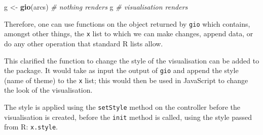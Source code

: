 \documentclass[10pt,]{krantz}
\makeatletter
\newenvironment{Shaded}{\begin{snugshade}}{\end{snugshade}}
\newcommand{\CommentTok}[1]{\textcolor[rgb]{0.37,0.37,0.37}{\textit{#1}}}
\newcommand{\ControlFlowTok}[1]{\textcolor[rgb]{0.27,0.27,0.27}{\textbf{#1}}}
\newcommand{\DataTypeTok}[1]{\textcolor[rgb]{0.27,0.27,0.27}{#1}}
\newcommand{\KeywordTok}[1]{\textcolor[rgb]{0.27,0.27,0.27}{\textbf{#1}}}
\newcommand{\NormalTok}[1]{#1}
\newcommand{\OperatorTok}[1]{\textcolor[rgb]{0.43,0.43,0.43}{\textbf{#1}}}
\newcommand{\StringTok}[1]{\textcolor[rgb]{0.5,0.5,0.5}{#1}}
\newenvironment{kframe}{%
\medskip{}
\setlength{\fboxsep}{.8em}
 \def\at@end@of@kframe{}%
 \ifinner\ifhmode%
  \def\at@end@of@kframe{\end{minipage}}%
  \begin{minipage}{\columnwidth}%
 \fi\fi%
 \def\FrameCommand##1{\hskip\@totalleftmargin \hskip-\fboxsep
 \colorbox{shadecolor}{##1}\hskip-\fboxsep
     \hskip-\linewidth \hskip-\@totalleftmargin \hskip\columnwidth}%
 \MakeFramed {\advance\hsize-\width
   \@totalleftmargin\z@ \linewidth\hsize
   \@setminipage}}%
 {\par\unskip\endMakeFramed%
 \at@end@of@kframe}
\renewenvironment{Shaded}{\begin{kframe}}{\end{kframe}}
\makeatother
\begin{document}
\begin{Shaded}
\begin{Highlighting}[]
\NormalTok{g <-}\StringTok{ }\KeywordTok{gio}\NormalTok{(arcs) }\CommentTok{# nothing renders}
\NormalTok{g }\CommentTok{# visualisation renders}
\end{Highlighting}
\end{Shaded}

Therefore, one can use functions on the object returned by \texttt{gio} which contains, amongst other things, the \texttt{x} list to which we can make changes, append data, or do any other operation that standard R lists allow.

\begin{Shaded}
\end{Shaded}

This clarified the function to change the style of the visualisation can be added to the package. It would take as input the output of \texttt{gio} and append the style (name of theme) to the \texttt{x} list; this would then be used in JavaScript to change the look of the visualisation.

\begin{Shaded}
\end{Shaded}

The style is applied using the \texttt{setStyle} method on the controller before the visualisation is created, before the \texttt{init} method is called, using the style passed from R: \texttt{x.style}.
\end{document}

